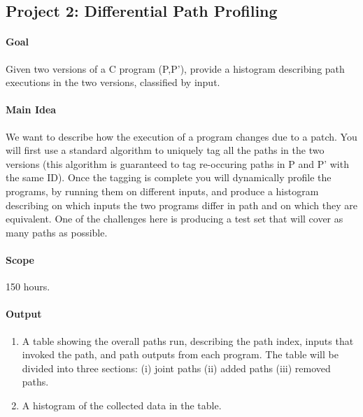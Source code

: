 \documentclass[english]{article}
\begin{document}
\subsection*{Project 2: Differential Path Profiling}
\paragraph{Goal} Given two versions of a C program (P,P'), provide a histogram describing path executions in the two versions, classified by input.
\paragraph{Main Idea} We want to describe how the execution of a program changes due to a patch. You will first use a standard algorithm to uniquely tag all the paths in the two versions (this algorithm is guaranteed to tag re-occuring paths in P and P' with the same ID). Once the tagging is complete you will dynamically profile the programs, by running them on different inputs, and produce a histogram describing on which inputs the two programs differ in path and on which they are equivalent. One of the challenges here is producing a test set that will cover as many paths as possible.
\paragraph{Scope} 150 hours.
\paragraph{Output} 
\begin{enumerate}
\item A table showing the overall paths run, describing the path index, inputs that invoked the path, and path outputs from each program. The table will be divided into three sections: (i) joint paths (ii) added paths (iii) removed paths.
\item A histogram of the collected data in the table.
\end{enumerate}
\end{document}

